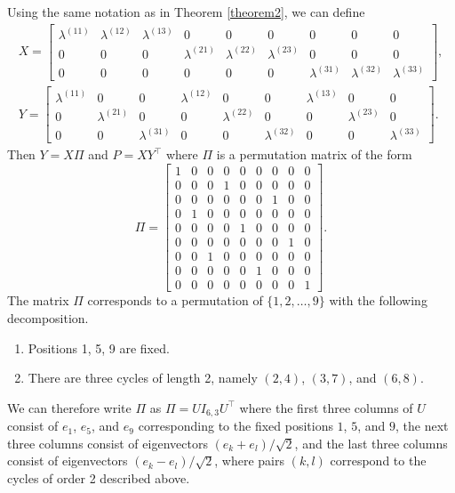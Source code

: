 \documentclass[12pt]{article}
\begin{document}
\begin{example}[$K = 3$] Using the same notation as in Theorem
  \ref{theorem2}, we can define
\begin{gather*}
X = \begin{bmatrix} 
\lambda^{(11)} & \lambda^{(12)} & \lambda^{(13)} & 0 & 0 & 0 & 0 & 0 & 0 \\
0 & 0 & 0 & \lambda^{(21)} & \lambda^{(22)} & \lambda^{(23)} & 0 & 0 & 0 \\
0 & 0 & 0 & 0 & 0 & 0 & \lambda^{(31)} & \lambda^{(32)} & \lambda^{(33)}
\end{bmatrix}, \\
Y = \begin{bmatrix} 
\lambda^{(11)} & 0 & 0 & \lambda^{(12)} & 0 & 0 & \lambda^{(13)} & 0 & 0 \\
0 & \lambda^{(21)} & 0 & 0 & \lambda^{(22)} & 0 & 0 & \lambda^{(23)} & 0 \\
0 & 0 & \lambda^{(31)} & 0 & 0 & \lambda^{(32)} & 0 & 0 & \lambda^{(33)}
\end{bmatrix}.
\end{gather*}
Then $Y = X \Pi$ and $P = X Y^{\top}$ where $\Pi$ is a permutation matrix of
the form
$$\Pi = \begin{bmatrix} 
1 & 0 & 0 & 0 & 0 & 0 & 0 & 0 & 0 \\
0 & 0 & 0 & 1 & 0 & 0 & 0 & 0 & 0 \\
0 & 0 & 0 & 0 & 0 & 0 & 1 & 0 & 0 \\
0 & 1 & 0 & 0 & 0 & 0 & 0 & 0 & 0 \\
0 & 0 & 0 & 0 & 1 & 0 & 0 & 0 & 0 \\
0 & 0 & 0 & 0 & 0 & 0 & 0 & 1 & 0 \\
0 & 0 & 1 & 0 & 0 & 0 & 0 & 0 & 0 \\
0 & 0 & 0 & 0 & 0 & 1 & 0 & 0 & 0 \\
0 & 0 & 0 & 0 & 0 & 0 & 0 & 0 & 1
\end{bmatrix}.$$
The matrix $\Pi$ corresponds to a permutation of $\{1,2,\dots,9\}$
with the following decomposition.
\begin{enumerate}
\item Positions 1, 5, 9 are fixed.
\item There are three cycles of length 2, namely $(2, 4)$, $(3, 7)$, and $(6, 8)$.
\end{enumerate}
We can therefore write $\Pi$ as $\Pi = U I_{6, 3} U^\top$ where the first three 
columns of $U$ consist of $e_1$, $e_5$, and $e_9$ corresponding to the fixed 
positions $1$, $5$, and $9$, the next three columns consist of eigenvectors 
$(e_k + e_l) / \sqrt{2}$, and the last three columns consist of eigenvectors 
$(e_k - e_l) / \sqrt{2}$, where pairs $(k, l)$ correspond to the cycles of 
order 2 described above.


\end{example}
\end{document}
